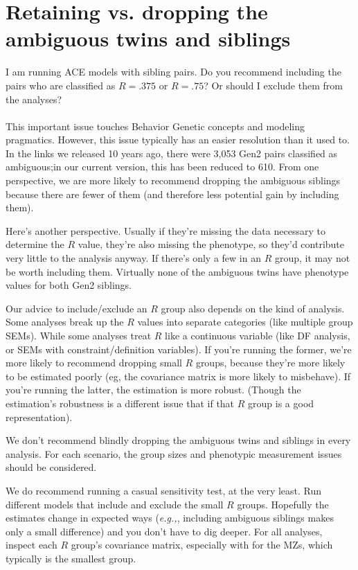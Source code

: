 \documentclass{article}\usepackage[]{graphicx}\usepackage[]{color}
\begin{document}
\section{Retaining vs. dropping the ambiguous twins and siblings}
\textsf{I am running ACE models with sibling pairs.  Do you recommend including the pairs who are classified as $R=.375$ or $R=.75$?  Or should I exclude them from the analyses?}\\ \\
This important issue touches Behavior Genetic concepts and modeling pragmatics.  However, this issue typically has an easier resolution than it used to.  In the links we released 10 years ago, there were 3,053 Gen2 pairs classified as ambiguous;in our current version, this has been reduced to 610.  From one perspective, we are more likely to recommend dropping the ambiguous siblings because there are fewer of them (and therefore less potential gain by including them).

Here's another perspective.  Usually if they're missing the data necessary to determine the $R$ value, they're also missing the phenotype, so they'd contribute very little to the analysis anyway.  If there's only a few in an $R$ group, it may not be worth including them.  Virtually none of the ambiguous twins have phenotype values for both Gen2 siblings.

Our advice to include/exclude an $R$ group also depends on the kind of analysis.  Some analyses break up the $R$ values into separate categories (like multiple group SEMs).  While some analyses treat $R$ like a continuous variable (like DF analysis, or SEMs with constraint/definition variables).  If you're running the former, we're more likely to recommend dropping small $R$ groups, because they're more likely to be estimated poorly (eg, the covariance matrix is more likely to misbehave).  If you're running the latter, the estimation is more robust.  (Though the estimation's robustness is a different issue that if that $R$ group is a good representation).

We don't recommend blindly dropping the ambiguous twins and siblings in every analysis.  For each scenario, the group sizes and phenotypic measurement issues should be considered.

We do recommend running a casual sensitivity test, at the very least.  Run different models that include and exclude the small $R$ groups.  Hopefully the estimates change in expected ways (\emph{e.g.,}, including ambiguous siblings makes only a small difference)  and you don't have to dig deeper.  For all analyses, inspect each $R$ group's covariance matrix, especially with for the MZs, which typically is the smallest group. 
\end{document}
